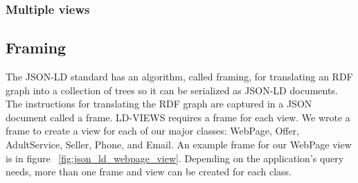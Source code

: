 \subsubsection{Multiple views}

\subsection{Framing}
The JSON-LD standard has an algorithm, called framing, for translating an RDF graph into a collection of trees so it can be serialized as JSON-LD documents. \cite{sporny:jsonld-framing}
The instructions for translating the RDF graph are captured in a JSON document called a frame.  
LD-VIEWS requires a frame for each view.  
We wrote a frame to create a view for each of our major classes: WebPage, Offer, AdultService, Seller, Phone, and Email.  
An example frame for our WebPage view is in figure ~\ref{fig:json_ld_webpage_view}.  
Depending on the application's query needs, more than one frame and view can be created for each class.  

